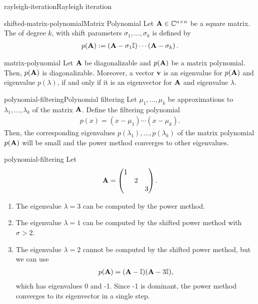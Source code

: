 \begin{Algorithm*}{rayleigh-iteration}{Rayleigh iteration}
  
\end{Algorithm*}

\begin{Definition*}{shifted-matrix-polynomial}{Matrix Polynomial}
  Let \(\mathbf A \in \mathbb C^{n \times n}\) be a square matrix.
  The  of degree \(k\), with shift parameters \(\sigma_1, \ldots, \sigma_k\) is defined by
  \begin{gather}
    p(\mathbf A) := \left(\mathbf A - \sigma_1 \mathbb I \right) \cdots \left(\mathbf A - \sigma_k\right).    
  \end{gather}
\end{Definition*}

\begin{Lemma}{matrix-polynomial}
  Let $\mathbf A$ be diagonalizable and $p(\mathbf A)$ be a matrix
  polynomial. Then, $p(\mathbf A)$ is diagonalizable. Moreover, a vector
  $\mathbf v$ is an eigenvalue for $p(\mathbf A)$ and eigenvalue $p(\lambda)$,
  if and only if it is an eigenvector for $\mathbf A$ and eigenvalue $\lambda$.
\end{Lemma}

\begin{Algorithm*}{polynomial-filtering}{Polynomial filtering}
  Let $\mu_1,\dots,\mu_k$ be approximations to  $\lambda_1,\dots,\lambda_k$ of the matrix
  $\mathbf A$. Define the filtering polynomial
  \begin{gather}
    p(x) = (x-\mu_1)\cdots(x-\mu_k).
  \end{gather}
  Then, the corresponding eigenvalues
  $p(\lambda_1),\dots,p(\lambda_k)$ of the matrix polynomial
  $p(\mathbf A)$ will be small and the power method converges to other
  eigenvalues.
\end{Algorithm*}

\begin{Example}{polynomial-filtering}
  Let
  \begin{gather}
    \mathbf A =
    \begin{pmatrix}
      1&&\\ &2& \\ &&3      
    \end{pmatrix}.
  \end{gather}
  \begin{enumerate}
  \item The eigenvalue $\lambda=3$ can be computed by the power method.
  \item The eigenvalue $\lambda=1$ can be computed by the shifted power method with $\sigma>2$.
  \item The eigenvalue $\lambda=2$ cannot be computed by the shifted power method, but we can use
    \begin{gather}
      p(\mathbf A) = (\mathbf A-\mathbb I)(\mathbf A-3\mathbb I),
    \end{gather}
    which has eigenvalues 0 and -1. Since -1 is dominant, the power
    method converges to its eigenvector in a single step.
  \end{enumerate}
\end{Example}

